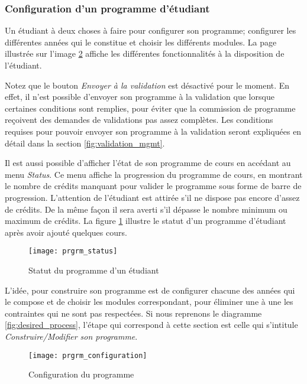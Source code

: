 \subsubsection{Configuration d'un programme d'étudiant}
\label{prgrm_mgmt}
Un étudiant à deux choses à faire pour configurer son programme; configurer les différentes années qui le constitue et choisir les différents modules. La page illustrée sur l'image \ref{fig:program_configure} affiche les différentes fonctionnalités à la disposition de l'étudiant. 

Notez que le bouton \textit{Envoyer à la validation} est désactivé pour le moment. En effet, il n'est possible d'envoyer son programme à la validation que lorsque certaines conditions sont remplies, pour éviter que la commission de programme reçoivent des demandes de validations pas assez complètes. Les conditions requises pour pouvoir envoyer son programme à la validation seront expliquées en détail dans la section \ref{fig:validation_mgmt}. 

Il est aussi possible d'afficher l'état de son programme de cours en accédant au menu \textit{Status}. Ce menu affiche la progression du programme de cours, en montrant le nombre de crédits manquant pour valider le programme sous forme de barre de progression. L'attention de l'étudiant est attirée s'il ne dispose pas encore d'assez de crédits. De la même façon il sera averti s'il dépasse le nombre minimum ou maximum de crédits. La figure \ref{fig:prgrm_status} illustre le statut d'un programme d'étudiant après avoir ajouté quelques cours.

\begin{figure}
\centering
\caption{Statut du programme d'un étudiant}
\label{fig:prgrm_status}
\texttt{[image: prgrm\_status]}
\end{figure} 


L'idée, pour construire son programme est de configurer chacune des années qui le compose et de choisir les modules correspondant, pour éliminer une à une les contraintes qui ne sont pas respectées. Si nous reprenons le diagramme \ref{fig:desired_process}, l'étape qui correspond à cette section est celle qui s'intitule \textit{Construire/Modifier son programme}.



\begin{figure}
\centering
\caption{Configuration du programme}
\label{fig:program_configure}
\texttt{[image: prgrm\_configuration]}
\end{figure}


